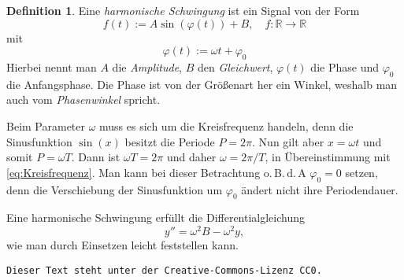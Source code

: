 \documentclass[a4paper,11pt,fleqn,twoside]{article}
\newcommand{\R}{\mathbb R}
\newcommand{\emdef}[1]{\emph{#1}}
\theoremstyle{definition}
\newtheorem{Definition}{Definition}
\theoremstyle{theorem}
\numberwithin{equation}{section}
\begin{document}
\begin{Definition}
Eine \emdef{harmonische Schwingung} ist ein Signal von der Form
\begin{equation}
f(t) := A\sin(\varphi(t))+B,\quad f\colon\R\to\R
\end{equation}
mit
\begin{equation}
\varphi(t) := \omega t+\varphi_0
\end{equation}
Hierbei nennt man $A$ die \emdef{Amplitude}, $B$ den \emdef{Gleichwert},
$\varphi(t)$ die Phase und $\varphi_0$ die Anfangsphase. Die
Phase ist von der Größenart her ein Winkel, weshalb man auch vom
\emdef{Phasenwinkel} spricht.
\end{Definition}
Beim Parameter $\omega$ muss es sich um die Kreisfrequenz handeln,
denn die Sinusfunktion $\sin(x)$ besitzt die Periode $P=2\pi$.
Nun gilt aber $x=\omega t$ und somit $P=\omega T$. Dann ist
$\omega T=2\pi$ und daher $\omega=2\pi/T$, in Übereinstimmung mit
\eqref{eq:Kreisfrequenz}. Man kann bei dieser Betrachtung
o.\,B.\,d.\,A $\varphi_0=0$ setzen, denn die Verschiebung
der Sinusfunktion um $\varphi_0$ ändert nicht ihre Periodendauer.

Eine harmonische Schwingung erfüllt die Differentialgleichung
\begin{equation}
y'' = \omega^2 B-\omega^2 y,
\end{equation}
wie man durch Einsetzen leicht feststellen kann.


\vfill\noindent
\texttt{Dieser Text steht unter der Creative-Commons-Lizenz CC0.}
\end{document}
